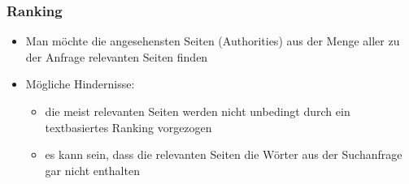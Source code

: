 \documentclass[hyperref={pdfpagelabels=false}]{beamer}
\begin{document}
\begin{frame}
\frametitle{Ranking}

\begin{itemize}
\item Man möchte die angesehensten Seiten (Authorities) aus der Menge aller zu der Anfrage relevanten Seiten finden
\item Mögliche Hindernisse:
	\begin{itemize}
	\item die meist relevanten Seiten werden nicht unbedingt durch ein textbasiertes Ranking vorgezogen
	\item es kann sein,  dass die relevanten Seiten die Wörter aus der Suchanfrage gar nicht enthalten
	\end{itemize}
\end{itemize}
\end{frame}
\end{document}
